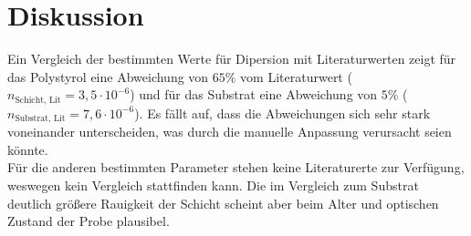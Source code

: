 \section{Diskussion}
Ein Vergleich der bestimmten Werte für Dipersion mit Literaturwerten zeigt für das Polystyrol
eine Abweichung von $65\%$ vom Literaturwert ($n_\text{Schicht, Lit}=3{,}5\cdot10^{-6}$\cite{anleitung}) und für das Substrat eine Abweichung von $5\%$ ($n_\text{Substrat, Lit}=7{,}6\cdot10^{-6}$\cite{anleitung}). Es fällt auf, dass die Abweichungen sich sehr stark voneinander unterscheiden, was durch die manuelle Anpassung verursacht seien könnte.\\ Für die anderen bestimmten Parameter stehen keine Literaturerte zur Verfügung, weswegen kein Vergleich stattfinden kann. Die im Vergleich zum Substrat deutlich größere Rauigkeit der Schicht scheint aber beim Alter und optischen Zustand der Probe plausibel. 
